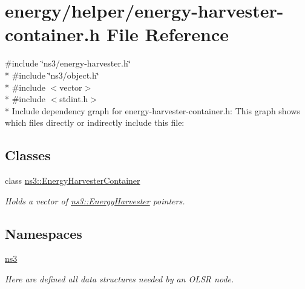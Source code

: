 \hypertarget{energy-harvester-container_8h}{}\section{energy/helper/energy-\/harvester-\/container.h File Reference}
\label{energy-harvester-container_8h}
{\ttfamily \#include \char`\"{}ns3/energy-\/harvester.\+h\char`\"{}}\\*
{\ttfamily \#include \char`\"{}ns3/object.\+h\char`\"{}}\\*
{\ttfamily \#include $<$vector$>$}\\*
{\ttfamily \#include $<$stdint.\+h$>$}\\*
Include dependency graph for energy-\/harvester-\/container.h\+:
This graph shows which files directly or indirectly include this file\+:
\subsection*{Classes}
\begin{DoxyCompactItemize}
\item 
class \hyperlink{classns3_1_1EnergyHarvesterContainer}{ns3\+::\+Energy\+Harvester\+Container}
\begin{DoxyCompactList}\small\item\em Holds a vector of \hyperlink{classns3_1_1EnergyHarvester}{ns3\+::\+Energy\+Harvester} pointers. \end{DoxyCompactList}\end{DoxyCompactItemize}
\subsection*{Namespaces}
\begin{DoxyCompactItemize}
\item 
 \hyperlink{namespacens3}{ns3}
\begin{DoxyCompactList}\small\item\em Here are defined all data structures needed by an O\+L\+SR node. \end{DoxyCompactList}\end{DoxyCompactItemize}
